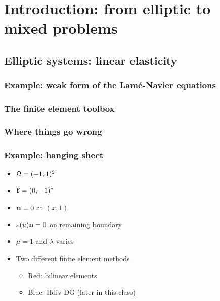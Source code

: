 \documentclass[american,ignorenonframetext,notheorems]{beamer}
\begin{document}
\section{Introduction: from elliptic to mixed problems}
\subsection{Elliptic systems: linear elasticity}
\subsubsection{Example: weak form of the Lamé-Navier equations}
\subsubsection{The finite element toolbox}
\subsubsection{Where things go wrong}

\begin{frame}
  \frametitle{Example: hanging sheet}
  \begin{itemize}
  \item $\Omega = (-1,1)^2$
  \item $\mathbf f = (0,-1)^*$
  \item $\mathbf u = 0$ at $(x,1)$
  \item $\varepsilon(u) \mathbf n = 0$ on remaining boundary
  \item $\mu=1$ and $\lambda$ varies
  \item Two different finite element methods
    \begin{itemize}
    \item Red: bilinear elements
    \item Blue: Hdiv-DG (later in this class)
    \end{itemize}
  \end{itemize}
\end{frame}
\end{document}
